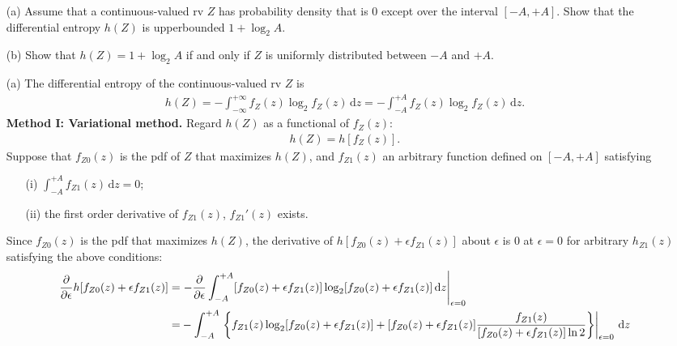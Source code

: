\documentclass{assignment}
\begin{document}
\begin{prob}[3.5]
    \begin{itemize}
        \item[(a)] Assume that a continuous-valued rv $Z$ has probability density that is $0$ except over the interval $[-A,+A]$. Show that the differential entropy $h(Z)$ is upperbounded $1+\log_2A$.
        \item[(b)] Show that $h(Z)=1+\log_2A$ if and only if $Z$ is uniformly distributed between $-A$ and $+A$.
    \end{itemize}
\end{prob}
\begin{sol}
    \begin{itemize}
        \item[(a)] The differential entropy of the continuous-valued rv $Z$ is
        \begin{align}
            h(Z)=-\int_{-\infty}^{+\infty}f_Z(z)\log_2f_Z(z)\,\mathrm{d}z=-\int_{-A}^{+A}f_Z(z)\log_2f_Z(z)\,\mathrm{d}z.
        \end{align}
        \textbf{Method I: Variational method.} Regard $h(Z)$ as a functional of $f_Z(z)$:
        \begin{align}
            h(Z)=h[f_Z(z)].
        \end{align}
        Suppose that $f_{Z0}(z)$ is the pdf of $Z$ that maximizes $h(Z)$, and $f_{Z1}(z)$ an arbitrary function defined on $[-A,+A]$ satisfying
        \begin{itemize}
            \item[(i)] $\int_{-A}^{+A}f_{Z1}(z)\,\mathrm{d}z=0$;
            \item[(ii)] the first order derivative of $f_{Z1}(z)$, $f_{Z1}'(z)$ exists.
        \end{itemize}
        Since $f_{Z0}(z)$ is the pdf that maximizes $h(Z)$, the derivative of $h[f_{Z0}(z)+\epsilon f_{Z1}(z)]$ about $\epsilon$ is $0$ at $\epsilon=0$ for arbitrary $h_{Z1}(z)$ satisfying the above conditions:
        \begin{align}
            \label{P-4-variaional-method-necessary-condition}
            \notag\frac{\partial}{\partial\epsilon}h[f_{Z0}(z)+\epsilon f_{Z1}(z)]=&\left.-\frac{\partial}{\partial\epsilon}\int_{-A}^{+A}[f_{Z0}(z)+\epsilon f_{Z1}(z)]\log_2[f_{Z0}(z)+\epsilon f_{Z1}(z)]\,\mathrm{d}z\right\rvert_{\epsilon=0}\\
            \notag=&-\int_{-A}^{+A}\left.\left\{f_{Z1}(z)\log_2[f_{Z0}(z)+\epsilon f_{Z1}(z)]+[f_{Z0}(z)+\epsilon f_{Z1}(z)]\frac{f_{Z1}(z)}{[f_{Z0}(z)+\epsilon f_{Z1}(z)]\ln 2}\right\}\right\rvert_{\epsilon=0}\,\mathrm{d}z\\

\end{align}
\end{itemize}
\end{sol}
\end{document}
